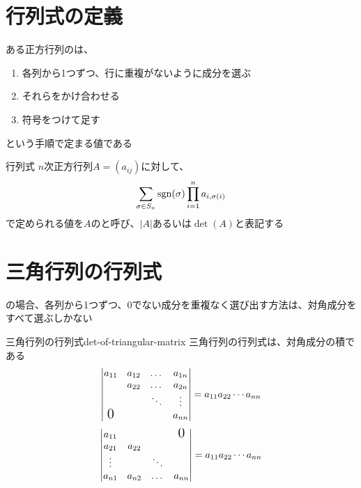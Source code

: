 \documentclass[../../../topic_linear-algebra]{subfiles}
\begin{document}
\sectionline
\section{行列式の定義}

ある正方行列のは、
\begin{enumerate}
  \item 各列から1つずつ、行に重複がないように成分を選ぶ
  \item それらをかけ合わせる
  \item 符号をつけて足す
\end{enumerate}
という手順で定まる値である

\begin{definition}{行列式}
  $n$次正方行列$A = (a_{ij})$に対して、
  \begin{equation*}
    \sum_{\sigma \in S_n} \operatorname{sgn}(\sigma) \prod_{i=1}^n a_{i,\sigma(i)}
  \end{equation*}
  で定められる値を$A$のと呼び、$|A|$あるいは$\det(A)$と表記する
\end{definition}

\sectionline
\section{三角行列の行列式}

の場合、各列から1つずつ、0でない成分を重複なく選び出す方法は、対角成分をすべて選ぶしかない

\begin{theorem}{三角行列の行列式}{det-of-triangular-matrix}
  三角行列の行列式は、対角成分の積である
  \begin{equation*}
    \left|\begin{matrix}
      a_{11}           & a_{12} & \dots  & a_{1n} \\
                       & a_{22} & \dots  & a_{2n} \\
                       &        & \ddots & \vdots \\
      \text{\Large{0}} &        &        & a_{nn}
    \end{matrix}\right| = a_{11} a_{22} \cdots a_{nn}
  \end{equation*}
  \begin{equation*}
    \left|\begin{matrix}
      a_{11} &        &        & \text{\Large{0}} \\
      a_{21} & a_{22}                             \\
      \vdots &        & \ddots                    \\
      a_{n1} & a_{n2} & \dots  & a_{nn}
    \end{matrix}\right| = a_{11} a_{22} \cdots a_{nn}
  \end{equation*}
\end{theorem}
\end{document}
